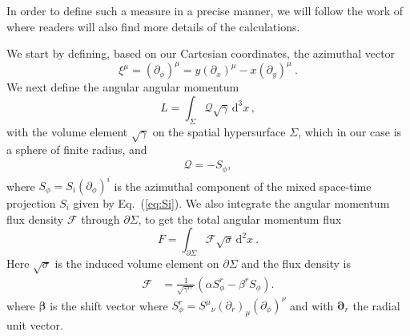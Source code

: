 \documentclass[11pt]{report}  %
\newcommand{\bs}{\boldsymbol}
\newcommand{\dd}{\mathrm{d}}
\newcommand{\bs}{\boldsymbol}
\begin{document}
In order to define such a measure in a
precise manner, we will follow the work of \cite{Croft:2022gks,Clough:2021qlv} where readers will also
find more details of the calculations.



We start by defining, based on our Cartesian coordinates, the azimuthal vector
\begin{equation}
    {\xi}^\mu = (\partial_{\phi})^\mu = y(\partial_x)^\mu - x (\partial_y)^\mu~.
\end{equation}
We next define the angular angular momentum
\begin{equation}
    \mathbin{{L = \int_{\Sigma} \mathcal{Q} \sqrt{\gamma}\,
    \dd^3x}}\,,
\end{equation}
with the volume element $\sqrt{\gamma}$ on the spatial hypersurface $\Sigma$, which in our case is a sphere of finite radius, and 
\begin{align}   
    \mathcal{Q} = -S_\phi, 
\end{align}
where $S_\phi = S_i (\partial_\phi)^i$ is the azimuthal component of
the mixed space-time projection $S_i$ given by Eq.~(\ref{eq:Si}). 
We also integrate the angular momentum flux density $\mathcal{F}$ through
$\partial \Sigma$, to get the total angular momentum flux
\begin{equation}
    \mathbin{{F = \int_{\partial \Sigma} \mathcal{F} \sqrt{\sigma }\,
    \dd^2x}}~.\label{eqn:DefAngMomFlux}
\end{equation}
Here $\sqrt{\sigma}$ is the induced volume element on $\partial \Sigma$ and the flux density is
\begin{align}
    \mathcal{F} &= \frac{1}{\sqrt{\gamma^{rr}}}\left(\alpha S^r_\phi -\beta^r S_\phi\right).
\end{align}
where $\bs\beta$ is the shift vector where $S^r_\phi = {S^{\mu}}_{\nu} (\partial_r)_{\mu} (\partial_\phi)^{\nu} $ and with $\bs{\partial}_{r}$ the radial unit vector.
\end{document}
